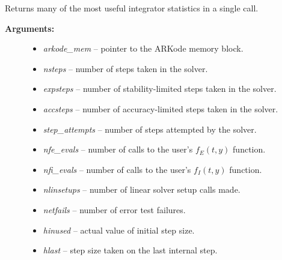 \documentclass[letterpaper,10pt,english]{sphinxmanual}
\begin{document}

\begin{fulllineitems}
\label{c_interface/User_callable:c.ARKodeGetIntegratorStats}
Returns many of the most useful integrator statistics in a single call.
\begin{description}
\item[{\textbf{Arguments:}}] \leavevmode\begin{itemize}
\item {} 
\emph{arkode\_mem} -- pointer to the ARKode memory block.

\item {} 
\emph{nsteps} -- number of steps taken in the solver.

\item {} 
\emph{expsteps} -- number of stability-limited steps taken in the solver.

\item {} 
\emph{accsteps} -- number of accuracy-limited steps taken in the solver.

\item {} 
\emph{step\_attempts} -- number of steps attempted by the solver.

\item {} 
\emph{nfe\_evals} -- number of calls to the user's \(f_E(t,y)\) function.

\item {} 
\emph{nfi\_evals} -- number of calls to the user's \(f_I(t,y)\) function.

\item {} 
\emph{nlinsetups} -- number of linear solver setup calls made.

\item {} 
\emph{netfails} -- number of error test failures.

\item {} 
\emph{hinused} -- actual value of initial step size.

\item {} 
\emph{hlast} -- step size taken on the last internal step.


\end{itemize}
\end{description}
\end{fulllineitems}
\end{document}
